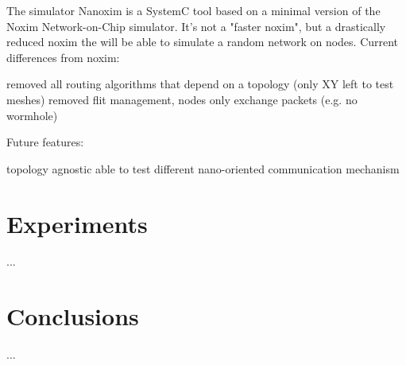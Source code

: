 \documentclass[conference]{IEEEtran}
\begin{document}
The simulator Nanoxim is a SystemC tool based on a minimal version of
the Noxim Network-on-Chip simulator. It's not a "faster noxim", but a
drastically reduced noxim the will be able to simulate a random
network on nodes. Current differences from noxim:

removed all routing algorithms that depend on a topology (only XY left
to test meshes) removed flit management, nodes only exchange packets
(e.g. no wormhole)

Future features:

topology agnostic able to test different nano-oriented communication
mechanism


\section{Experiments}
...


\section{Conclusions}
...


\balance

 


\end{document}

